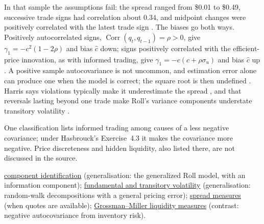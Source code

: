 \begin{qfresult}
 In that sample the assumptions fail: the spread ranged from \$0.01 to \$0.49, successive trade signs had correlation about $0.34$, and midpoint changes were positively correlated with the latest trade sign \citep[sec.~3.4, p.~30]{s6-hasbrouck}. The biases go both ways. Positively autocorrelated signs, $\operatorname{Corr}(q_t,q_{t-1})=\rho>0$, give $\gamma_1=-c^2(1-2\rho)$ and bias $\hat c$ down; signs positively correlated with the efficient-price innovation, as with informed trading, give $\gamma_1=-c(c+\rho\sigma_u)$ and bias $\hat c$ up \citep[sec.~4.4, Exercises~4.2--4.3, pp.~38--39]{s6-hasbrouck}. A positive sample autocovariance is not uncommon, and estimation error alone can produce one when the model is correct; the square root is then undefined \citep[sec.~4.5, p.~39]{s6-hasbrouck}. Harris says violations typically make it underestimate the spread \citep[chap.~``Liquidity and Transaction Cost Measurement'', p.~434]{alpha-harris}, and that reversals lasting beyond one trade make Roll's variance components understate transitory volatility \citep[chap.~``Volatility'', p.~416]{alpha-harris}.

One classification lists informed trading among causes of a less negative covariance; under Hasbrouck's Exercise~4.3 it makes the covariance more negative. Price discreteness and hidden liquidity, also listed there, are not discussed in the source.

 \hyperref[res:spread-component-identification]{component identification} (generalisation: the generalized Roll model, with an information component); \hyperref[def:volatility-components]{fundamental and transitory volatility} (generalisation: random-walk decompositions with a general pricing error); \hyperref[def:spread-measures]{spread measures} (when quotes are available); \hyperref[res:grossman-miller-liquidity-measures]{Grossman--Miller liquidity measures} (contrast: negative autocovariance from inventory risk).


\end{qfresult}

